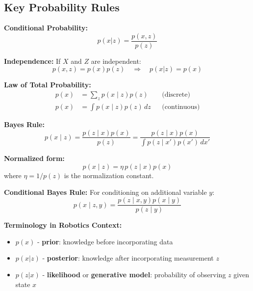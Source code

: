 \subsection{Key Probability Rules}

\begin{tcolorbox}[colback=blue!5!white,colframe=blue!75!black,title=Essential Probability Rules]

\textbf{Conditional Probability:}
\begin{equation}
    p(x|z) = \frac{p(x,z)}{p(z)}
\end{equation}

\textbf{Independence:} If $X$ and $Z$ are independent:
\begin{equation}
    p(x, z) = p(x)p(z) \quad \Rightarrow \quad p(x|z) = p(x)
\end{equation}

\textbf{Law of Total Probability:}
\begin{align}
  p(x) &= \sum_{z}{p(x \mid z)p(z)}  && \text{(discrete)}\\
  p(x) &= \int{p(x \mid z)p(z) \, dz} && \text{(continuous)}
\end{align}

\textbf{Bayes Rule:}
\begin{equation}
  p(x \mid z) = \frac{p(z \mid x)p(x)}{p(z)} = \frac{p(z \mid x)p(x)}{\int{p(z \mid x')p(x')\,dx'}}
\end{equation}

\textbf{Normalized form:}
\begin{equation}
  p(x \mid z) = \eta \, p(z \mid x)p(x)
  \label{eq:bayes_normalized}
\end{equation}
where $\eta = 1/p(z)$ is the normalization constant.

\textbf{Conditional Bayes Rule:} For conditioning on additional variable $y$:
\begin{equation}
  p(x \mid z, y) = \frac{p(z \mid x,y)p(x \mid y)}{p(z \mid y)}
\end{equation}

\end{tcolorbox}

\textbf{Terminology in Robotics Context:}
\begin{itemize}
    \item $p(x)$ - \textbf{prior}: knowledge before incorporating data
    \item $p(x|z)$ - \textbf{posterior}: knowledge after incorporating measurement $z$
    \item $p(z|x)$ - \textbf{likelihood} or \textbf{generative model}: probability of observing $z$ given state $x$
\end{itemize}

